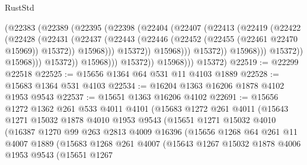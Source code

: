 \begin{lexlean}{RustStd}
\begin{coremodule}
                                    (@22383
                                      (@22389
                                        (@22395
                                          (@22398
                                            (@22404
                                              (@22407
                                                (@22413
                                                  (@22419
                                                    (@22422
                                                      (@22428
                                                        (@22431
                                                          (@22437
                                                            (@22443
                                                              (@22446
                                                                (@22452
                                                                  (@22455 (@22461 @22470 @15969))
                                                                  @15372))
                                                              @15968)))
                                                        @15372))
                                                    @15968)))
                                              @15372))
                                          @15968)))
                                    @15372))
                                @15968)))
                          @15372))
                      @15968)))
                @15372))
            @15968)))
      @15372)
@22519 := @22299 @22518
@22525 := @15656 @1364 @64 @531 @11 @4103 @1889
@22528 := @15683 @1364 @531 @4103
@22534 := @16204 @1363 @16206 @1878 @4102 @1953 @9543
@22537 := @15651 @1363 @16206 @4102
@22691 := @15656
    @1272
    @1362
    @261
    @533
    @4011
    @4101
    (@15683
      @1272
      @261
      @4011
      (@15643
        @1271
        @15032
        @1878
        @4010
        @1953
        @9543
        (@15651
          @1271
          @15032
          @4010
          (@16387
            @1270
            @99
            @263
            @2813
            @4009
            @16396
            (@15656
              @1268
              @64
              @261
              @11
              @4007
              @1889
              (@15683
                @1268
                @261
                @4007
                (@15643
                  @1267
                  @15032
                  @1878
                  @4006
                  @1953
                  @9543
                  (@15651
                    @1267

\end{coremodule}
\end{lexlean}
